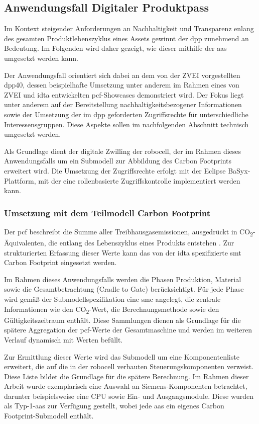 \newpage
\subsection{Anwendungsfall Digitaler Produktpass}
Im Kontext steigender Anforderungen an Nachhaltigkeit und Transparenz enlang des gesamten Produktlebenszyklus eines Assets gewinnt der \acs{dpp} zunehmend an Bedeutung.
Im Folgenden wird daher gezeigt, wie dieser mithilfe der \acs{aas} umgesetzt werden kann. 

Der Anwendungsfall orientiert sich dabei an dem von der ZVEI vorgestellten \acs{dpp40}, dessen beispielhafte Umsetzung unter anderem im Rahmen eines von ZVEI und \acs{idta} entwickelten \acs{pcf}-Showcases \cite{PCFShowcas} demonstriert wird. 
Der Fokus liegt unter anderem auf der Bereitstellung nachhaltigkeitsbezogener Informationen sowie der Umsetzung der im \acs{dpp} geforderten Zugriffsrechte für unterschiedliche Interessensgruppen.
Diese Aspekte sollen im nachfolgenden Abschnitt technisch umgesetzt werden.

Als Grundlage dient der digitale Zwilling der robocell, der im Rahmen dieses Anwendungsfalls um ein Submodell zur Abbildung des Carbon Footprints erweitert wird.
Die Umsetzung der Zugriffsrechte erfolgt mit der Eclipse BaSyx-Plattform, mit der eine rollenbasierte Zugriffskontrolle implementiert werden kann.

\subsubsection{Umsetzung mit dem Teilmodell Carbon Footprint}
Der \acs{pcf} beschreibt die Summe aller Treibhausgasemissionen, ausgedrückt in CO\textsubscript{2}-Äquivalenten, die entlang des Lebenszyklus eines Produkts entstehen \cite{PCF}. 
Zur strukturierten Erfassung dieser Werte kann das von der \acs{idta} spezifizierte \acs{smt} Carbon Footprint \cite{SpezifikaitonPCF} eingesetzt werden.

Im Rahmen dieses Anwendungsfalls werden die Phasen Produktion, Material sowie die Gesamtbetrachtung (Cradle to Gate) berücksichtigt. 
Für jede Phase wird gemäß der Submodellspezifikation eine \acs{smc} angelegt, die zentrale Informationen wie den CO\textsubscript{2}-Wert, die Berechnungsmethode sowie den Gültigkeitszeitraum enthält. 
Diese Sammlungen dienen als Grundlage für die spätere Aggregation der \acs{pcf}-Werte der Gesamtmaschine und werden im weiteren Verlauf dynamisch mit Werten befüllt.

Zur Ermittlung dieser Werte wird das Submodell um eine Komponentenliste erweitert, die auf die in der robocell verbauten Steuerungskomponenten verweist. 
Diese Liste bildet die Grundlage für die spätere Berechnung. 
Im Rahmen dieser Arbeit wurde exemplarisch eine Auswahl an Siemens-Komponenten betrachtet, darunter beispielsweise eine CPU sowie Ein- und Ausgangsmodule. 
Diese wurden als Typ-1-\acs{aas} zur Verfügung gestellt, wobei jede \acs{aas} ein eigenes Carbon Footprint-Submodell enthält.

